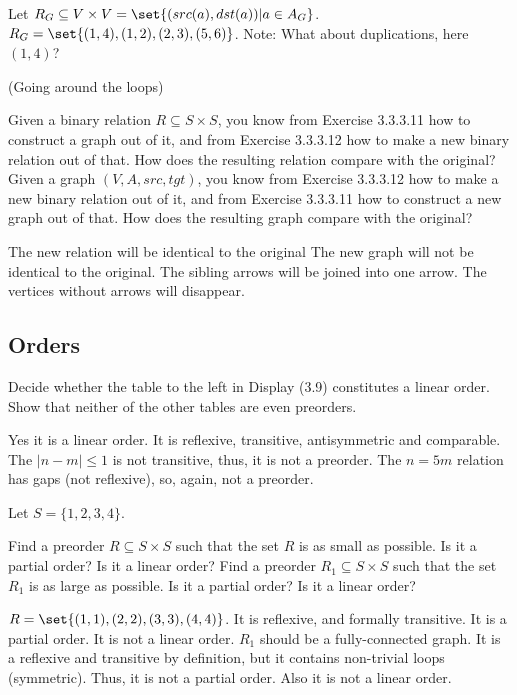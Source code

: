 \documentclass{article}
\begin{document}
\ans

\ls Let $R_G \subseteq V \times V = \set{(src(a), dst(a)) | a \in A_G}$.
\li $R_G = \set{(1,4),(1,2),(2,3),(5,6)}$. Note: What about duplications, here
    $(1,4)$?
\le


 (Going around the loops)

\ls Given a binary relation $R \subseteq S \times S$, you know from Exercise
    3.3.3.11 how to construct a graph out of it, and from Exercise 3.3.3.12 how
    to make a new binary relation out of that. How does the resulting relation
    compare with the original?
\li Given a graph $(V, A, src, tgt)$, you know from Exercise 3.3.3.12 how to
    make a new binary relation out of it, and from Exercise 3.3.3.11 how to
    construct a new graph out of that. How does the resulting graph compare with
    the original?
\le

\ans

\ls The new relation will be identical to the original
\li The new graph will not be identical to the original. The sibling arrows will
    be joined into one arrow. The vertices without arrows will disappear.
\le

\subsection{Orders}


\ls Decide whether the table to the left in Display (3.9) constitutes a linear
    order.
\li Show that neither of the other tables are even preorders.
\le

\ans

\ls Yes it is a linear order. It is reflexive, transitive, antisymmetric and
    comparable.
\li The $|n-m| \leq 1$ is not transitive, thus, it is not a preorder. The $n=5m$
    relation has gaps (not reflexive), so, again, not a preorder.
\le



Let $S = \{1, 2, 3, 4\}$.

\es Find a preorder $R \subseteq S \times S$ such that the set $R$ is as small
    as possible. Is it a partial order? Is it a linear order?
\ei Find a preorder $R_1 \subseteq S \times S$ such that the set $R_1$ is as
    large as possible. Is it a partial order? Is it a linear order?
\ee

\ans

\es $R = \set{(1,1),(2,2),(3,3),(4,4)}$. It is reflexive, and formally
    transitive. It is a partial order. It is not a linear order.
\ei $R_1$ should be a fully-connected graph. It is a reflexive and transitive by
    definition, but it contains non-trivial loops (symmetric). Thus, it is not a
    partial order. Also it is not a linear order.
\ee
\end{document}
